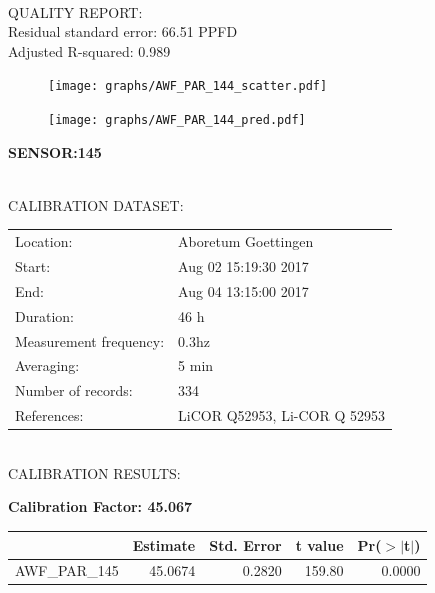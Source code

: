 \documentclass[oneside]{report}
\begin{document}
\hrulefill\\
QUALITY REPORT:\\
Residual standard error: 66.51 PPFD\\
Adjusted R-squared: 0.989



\begin{figure}[H]
  \centering
  \texttt{[image: graphs/AWF\_PAR\_144\_scatter.pdf]}
\end{figure}




\begin{figure}[H]
  \centering
  \texttt{[image: graphs/AWF\_PAR\_144\_pred.pdf]}
\end{figure}

\pagebreak


\begin{center}
\large{\textbf{SENSOR:145}}\\
\end{center}

\hrulefill\\
CALIBRATION DATASET:\\
\begin{table}[h!]
  \centering
  \label{tab:table1}
  \begin{tabular}{ll}
    Location: & Aboretum Goettingen\\ 
    
    
    Start:  & Aug 02 15:19:30 2017 \\
    End:   & Aug 04 13:15:00 2017\\ 
    Duration: & 46 h\\
    Measurement frequency: & 0.3hz\\
    Averaging:  &5 min\\
    Number of records: & 334 \\
    References: & LiCOR Q52953, Li-COR Q 52953 \\
  \end{tabular}
\end{table}

\hrulefill\\
CALIBRATION RESULTS:\\


\begin{center}
\textbf{\large{Calibration Factor: 45.067}}\\
\end{center}
\begin{table}[ht]
\centering
\begin{tabular}{rrrrr}
  \hline
 & Estimate & Std. Error & t value & Pr($>$$|$t$|$) \\ 
  \hline
AWF\_PAR\_145 & 45.0674 & 0.2820 & 159.80 & 0.0000 \\ 
   \hline
\end{tabular}
\end{table}
\end{document}

